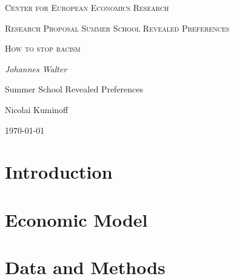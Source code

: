 \documentclass[12pt,a4paper]{article}
\author{Johannes Walter}
\begin{document}
\begin{titlepage}
    \centering
    \vspace{5cm}
    {\scshape\Large Center for European Economics Research \par}
    \vspace{1cm}
    {\scshape\Large Research Proposal Summer School Revealed Preferences \par}
    \vspace{1.5cm}
    {\scshape\LARGE How to stop racism \par}
    \vspace{2cm}
    {\Large\itshape Johannes Walter \par}
    \vfill
    Summer School Revealed Preferences \par 
    Nicolai Kuminoff 
    \vfill

    {\large \today\par}
\end{titlepage}

\section{Introduction}


\section{Economic Model}


\section{Data and Methods}

\end{document}
